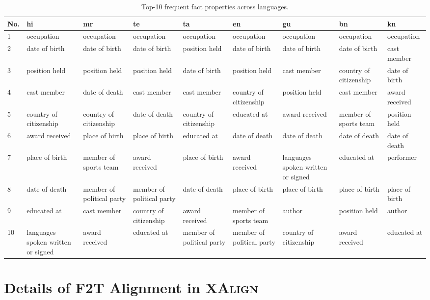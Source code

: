\documentclass[11pt]{article}
\begin{document}
\begin{table*}[!t]
    \centering
    \scriptsize
    \begin{tabular}{|l|p{0.65in}|p{0.65in}|p{0.65in}|p{0.65in}|p{0.65in}|p{0.65in}|p{0.65in}|p{0.65in}|}
    \hline
    No.&hi&mr&te&ta&en&gu&bn&kn\\
    \hline
    \hline
    1&occupation&occupation&occupation&occupation&occupation&occupation&occupation&occupation\\
    \hline
    2&date of birth&date of birth&date of birth&position held&date of birth&date of birth&date of birth&cast member\\
    \hline
    3&position held&position held&position held&date of birth&position held&cast member&country of citizenship&date of birth\\
    \hline
    4&cast member&date of death&cast member&cast member&country of citizenship&position held&cast member&award received\\
    \hline
    5&country of citizenship&country of citizenship&date of death&country of citizenship&educated at&award received&member of sports team&position held\\
    \hline
    6&award received&place of birth&place of birth&educated at&date of death&date of death&date of death&date of death\\
    \hline
    7&place of birth&member of sports team&award received&place of birth&award received&languages spoken written or signed&educated at&performer\\
    \hline
    8&date of death&member of political party&member of political party&date of death&place of birth&place of birth&place of birth&place of birth\\
    \hline
    9&educated at&cast member&country of citizenship&award received&member of sports team&author&position held&author\\
    \hline
    10&languages spoken written or signed&award received&educated at&member of political party&member of political party&country of citizenship&award received&educated at\\
    \hline
    \end{tabular}
    \caption{Top-10 frequent fact properties across languages.}
    \label{tab:topkpredicates}
\end{table*}

\section{Details of F2T Alignment in \textsc{XAlign}}
\end{document}
